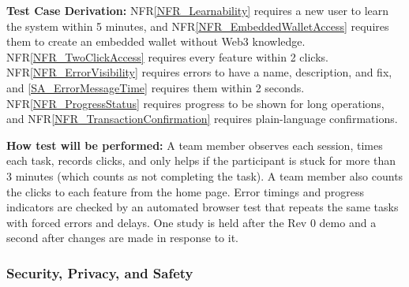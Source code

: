 \documentclass[12pt]{article}
\newcommand{\nfrref}[1]{NFR\ref{#1}}
\newcommand{\saref}[1]{\ref{#1}}
\begin{document}
\begin{enumerate}
\textbf{Test Case Derivation:} \nfrref{NFR_Learnability} requires a new user to learn the system within 5
minutes, and \nfrref{NFR_EmbeddedWalletAccess} requires them to create an embedded wallet without Web3
knowledge. \nfrref{NFR_TwoClickAccess} requires every feature within 2 clicks. \nfrref{NFR_ErrorVisibility} requires errors to
have a name, description, and fix, and \saref{SA_ErrorMessageTime} requires them within 2 seconds.
\nfrref{NFR_ProgressStatus} requires progress to be shown for long operations, and \nfrref{NFR_TransactionConfirmation} requires
plain-language confirmations.

\textbf{How test will be performed:} A team member observes each session, times each
task, records clicks, and only helps if the participant is stuck for more than
3 minutes (which counts as not completing the task). A team member also
counts the clicks to each feature from the home page. Error timings and
progress indicators are checked by an automated browser test that repeats the
same tasks with forced errors and delays. One study is held after the Rev 0
demo and a second after changes are made in response to it.

\end{enumerate}

\subsubsection{Security, Privacy, and Safety}
\end{document}
